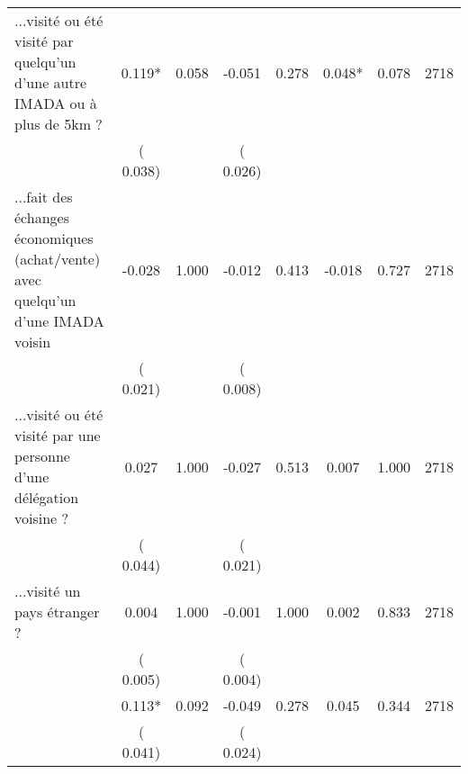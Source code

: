 \begin{tabular}{l*{7}{c}}
 ...visité ou été visité par quelqu'un d'une autre IMADA ou à plus de 5km ?       &              0.119*       &        0.058  &             -0.051       &        0.278  &              0.048*       &              0.078 &  2718 \\ 
                       &       (       0.038)             &                               &       (       0.026)                     &                               &                                               &                                &                      \\ 

 ...fait des échanges économiques (achat/vente) avec quelqu'un d'une IMADA voisin       &             -0.028       &        1.000  &             -0.012       &        0.413  &             -0.018       &              0.727 &  2718 \\ 
                       &       (       0.021)             &                               &       (       0.008)                     &                               &                                               &                                &                      \\ 

 ...visité ou été visité par une personne d'une délégation voisine ?       &              0.027       &        1.000  &             -0.027       &        0.513  &              0.007       &              1.000 &  2718 \\ 
                       &       (       0.044)             &                               &       (       0.021)                     &                               &                                               &                                &                      \\ 

 ...visité un pays étranger ?       &              0.004       &        1.000  &             -0.001       &        1.000  &              0.002       &              0.833 &  2718 \\ 
                       &       (       0.005)             &                               &       (       0.004)                     &                               &                                               &                                &                      \\ 

        &              0.113*       &        0.092  &             -0.049       &        0.278  &              0.045       &              0.344 &  2718 \\ 
                       &       (       0.041)             &                               &       (       0.024)                     &                               &                                               &                                &                      \\ 


\end{tabular}
